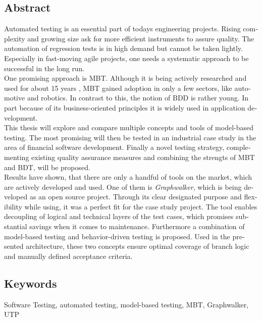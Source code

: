 \glsresetall
\begin{otherlanguage}{english}

  \chapter*{Abstract}

  Automated testing is an essential part of todays engineering projects. Rising complexity and growing size ask for more efficient instruments to assure quality. The automation of regression tests is in high demand but cannot be taken lightly. Especially in fast-moving agile projects, one needs a systematic approach to be successful in the long run.\\

  One promising approach is \Gls{MBT}. Although it is being actively researched and used for about 15 years \cite{utting_practical_2007}, \Gls{MBT} gained adoption in only a few sectors, like automotive and robotics. In contrast to this, the notion of \Gls{BDD} is rather young. In part because of its business-oriented principles it is widely used in application development.\\

  This thesis will explore and compare multiple concepts and tools of model-based testing. The most promising will then be tested in an industrial case study in the area of financial software development. Finally a novel testing strategy, complementing existing quality assurance measures and combining the strengts of \Gls{MBT} and \Gls{BDT}, will be proposed.\\

  Results have shown, that there are only a handful of tools on the market, which are actively developed and used. One of them is \textit{Graphwalker}, which is being developed as an open source project. Through its clear designated purpose and flexibility while using, it was a perfect fit for the case study project. The tool enables decoupling of logical and technical layers of the test cases, which promises substantial savings when it comes to maintenance. Furthermore a combination of model-based testing and behavior-driven testing is proposed. Used in the presented architecture, these two concepts ensure optimal coverage of branch logic and manually defined acceptance criteria.

  \bigskip

  \section*{Keywords}
  Software Testing, automated testing, model-based testing, MBT, Graphwalker, UTP

\end{otherlanguage}






















